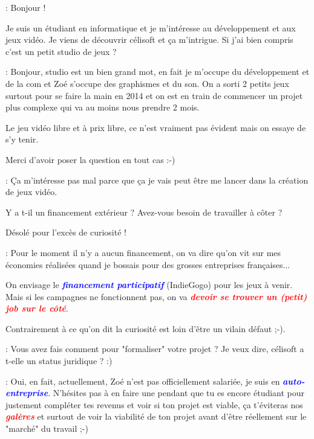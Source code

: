 \documentclass[a4paper,12pt, draft]{report}
\newcommand{\badPoint}[1]{\textcolor{red}{\textbf{\textit{#1}}}}
\newcommand{\importantPoint}[1]{\textcolor{blue}{\textbf{\textit{#1}}}}
\begin{document}
\begin{description}
\item [Question]: Bonjour !
\item Je suis un étudiant en informatique et je m'intéresse au développement et aux jeux vidéo. Je viens de découvrir célisoft et ça m'intrigue. Si j'ai bien compris c'est un petit studio de jeux ?
\item 
\item [Réponse]: Bonjour, studio est un bien grand mot, en fait je m'occupe du développement et de la com et Zoé s'occupe des graphismes et du son. On a sorti 2 petits jeux surtout pour se faire la main en 2014 et on est en train de commencer un projet plus complexe qui va au moins nous prendre 2 mois.
\item Le jeu vidéo libre et à prix libre, ce n'est vraiment pas évident mais on essaye de s'y tenir.
\item Merci d'avoir poser la question en tout cas :-)
\item 
\item 
\item [Question]: Ça m'intéresse pas mal parce que ça je vais peut être me lancer dans la création de jeux vidéo.
\item Y a t-il un financement extérieur ? Avez-vous besoin de travailler à côter ?
\item Désolé pour l'excès de curiosité !
\item 
\item [Réponse]: Pour le moment il n'y a aucun financement, on va dire qu'on vit sur mes économies réalisées quand je bossais pour des grosses entreprises françaises...
\item On envisage le \importantPoint{financement participatif} (IndieGogo) pour les jeux à venir. Mais si les campagnes ne fonctionnent pas, on va \badPoint{devoir se trouver un (petit) job sur le côté}.
\item 
\item Contrairement à ce qu'on dit la curiosité est loin d'être un vilain défaut ;-).
\item 
\item [Question]: Vous avez fais comment pour "formaliser" votre projet ? Je veux dire, célisoft a t-elle un status juridique ? :)
\item 
\item [Réponse]: Oui, en fait, actuellement, Zoé n'est pas officiellement salariée, je suis en \importantPoint{auto-entreprise}. N’hésites pas à en faire une pendant que tu es encore étudiant pour justement compléter tes revenus et voir si ton projet est viable, ça t'éviteras nos \badPoint{galères} et surtout de voir la viabilité de ton projet avant d'être réellement sur le "marché" du travail ;-)

\end{description}
\end{document}
